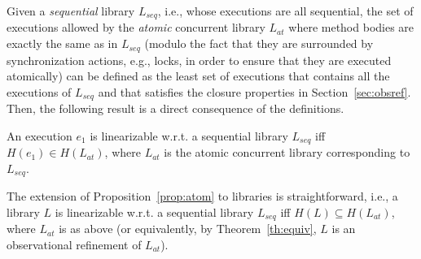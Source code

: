 Given a \emph{sequential} library $L_{seq}$, i.e., whose executions are all
sequential, the set of executions allowed by the \emph{atomic} concurrent
library $L_{at}$ where method bodies are exactly the same as in $L_{seq}$
(modulo the fact that they are surrounded by synchronization actions, e.g.,
locks, in order to ensure that they are executed atomically) can be defined as
the least set of executions that contains all the executions of $L_{seq}$ and
that satisfies the closure properties in Section~\ref{sec:obsref}. Then, the
following result is a direct consequence of the definitions.

\begin{proposition}
  \label{prop:atom}

  An execution $e_1$ is linearizable w.r.t. a sequential library $L_{seq}$ iff
  $H(e_1)\in H(L_{at})$, where $L_{at}$ is the atomic concurrent library
  corresponding to $L_{seq}$.

\end{proposition}

The extension of Proposition~\ref{prop:atom} to libraries is straightforward,
i.e., a library $L$ is linearizable w.r.t. a sequential library $L_{seq}$ iff
$H(L)\subseteq H(L_{at})$, where $L_{at}$ is as above (or equivalently, by
Theorem~\ref{th:equiv}, $L$ is an observational refinement of $L_{at}$).
